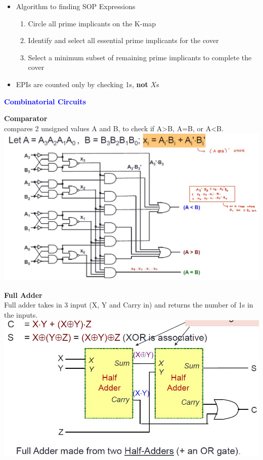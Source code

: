 \documentclass[a4paper]{article} \usepackage[backend=biber, style=numeric, sorting=none]{biblatex}
\begin{document}
\begin{multicols*}{4}
\begin{itemize}
\item Algorithm to finding SOP Expressions
\begin{enumerate}
    \item Circle all prime implicants on the K-map
    \item Identify and select all essential prime implicants for the cover
    \item Select a minimum subset of remaining prime implicants to complete the cover
\end{enumerate}
\item EPIs are counted only by checking 1s, {\bf not} $X$s
\end{itemize}
\columnbreak
{\small\textbf{\textcolor{blue}{Combinatorial Circuits}}}

\textbf{Comparator}\\
compares 2 unsigned values A and B, to check if A>B, A=B, or A<B.
\includegraphics[width=\columnwidth]{comparator}

\textbf{Full Adder}\\
Full adder takes in 3 input (X, Y and Carry in) and returns the number of 1s in the inputs.\\

\includegraphics[scale=0.3]{full_adder.jpg}


\end{multicols*}
\end{document}
